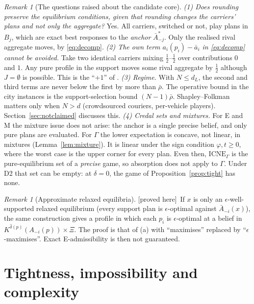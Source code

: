 \documentclass[11pt]{article}
\theoremstyle{definition}
\theoremstyle{remark}
\newtheorem{remark}[theorem]{Remark}
\newcommand{\abar}{\bar a}
\newcommand{\Abar}{\bar A}
\newcommand{\ICNE}{\mathrm{ICNE}}
\newcommand{\PROVED}{\textsf{[proved here]}}
\begin{document}
\begin{remark}[The questions raised about the candidate core]\label{rem:answers}
\emph{(1) Does rounding preserve the equilibrium conditions, given that rounding changes the carriers' plans and not only the aggregate?} Yes. All carriers, switched or not, play plans in $B_j$, which are exact best responses to the \emph{anchor} $\Abar^*_{-j}$. Only the realised rival aggregate moves, by \eqref{eq:decomp}.
\emph{(2) The own term $a_i(p_i)-\abar_i$ in \eqref{eq:decomp} cannot be avoided.} Take two identical carriers mixing $\tfrac12$--$\tfrac12$ over contributions $0$ and $1$. Any pure profile in the support moves some rival aggregate by $\tfrac12$ although $J=\emptyset$ is possible. This is the ``$+1$'' of \cite{LOW23}.
\emph{(3) Regime.} With $N\le d_L$, the second and third terms are never below the first by more than $\bar\rho$. The operative bound in the city instances is the support-selection bound $(N-1)\bar\rho$. Shapley--Folkman matters only when $N>d$ (crowdsourced couriers, per-vehicle players). Section~\ref{sec:notclaimed} discusses this.
\emph{(4) Credal sets and mixtures.} For E and M the mixture issue does not arise: the anchor is a single precise belief, and only pure plans are evaluated. For $\Gamma$ the lower expectation is concave, not linear, in mixtures (Lemma~\ref{lem:mixture}). It is linear under the sign condition $\varphi,t\ge0$, where the worst case is the upper corner for every plan. Even then, $\ICNE_\Gamma$ is the pure-equilibrium set of a \emph{precise} game, so absorption does not apply to $\Gamma$. Under D2 that set can be empty: at $\delta=0$, the game of Proposition~\ref{prop:tight} has none.
\end{remark}

\begin{remark}[Approximate relaxed equilibria]\label{rem:approx} \PROVED\
If $x$ is only an $\epsilon$-well-supported relaxed equilibrium (every support plan is $\epsilon$-optimal against $\Abar_{-i}(x)$), the same construction gives a profile in which each $p_i$ is $\epsilon$-optimal at a belief in $K^{\hat\delta(p)}(A_{-i}(p))\times\Xi$. The proof is that of (a) with ``maximises'' replaced by ``$\epsilon$-maximises''. Exact E-admissibility is then not guaranteed.
\end{remark}

\section{Tightness, impossibility and complexity}\label{sec:tight}
\end{document}
